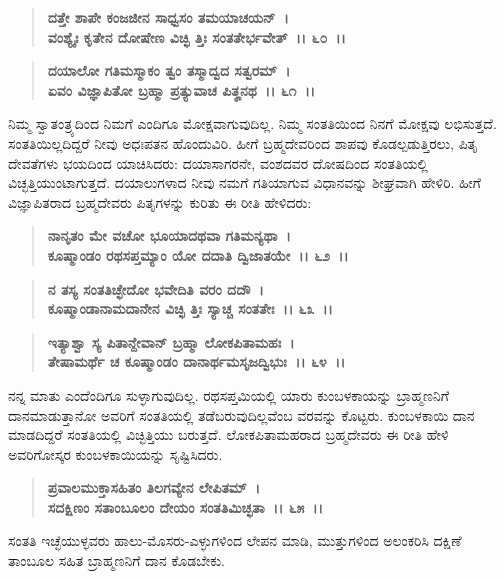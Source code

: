\begin{verse}
\textbf{ದತ್ತೇ ಶಾಪೇ ಕಂಜಜೀನ ಸಾಧ್ವಸಂ ತಮಯಾಚಯನ್~।}\\\textbf{ವಂಶ್ಯೈಃ ಕೃತೇನ ದೋಷೇಣ ವಿಚ್ಛಿ ತ್ತಿಃ ಸಂತತೇರ್ಭವೇತ್~।। ೬೦~।। }
\end{verse}

\begin{verse}
\textbf{ದಯಾಲೋ ಗತಿಮಸ್ಮಾಕಂ ತ್ವಂ ತಸ್ಮಾದ್ವದ ಸತ್ವರಮ್~।}\\\textbf{ಏವಂ ವಿಜ್ಞಾಪಿತೋ ಬ್ರಹ್ಮಾ ಪ್ರತ್ಯುವಾಚ ಪಿತೄನಥ~।। ೬೧~।।}
\end{verse}

ನಿಮ್ಮ ಸ್ವಾತಂತ್ರ್ಯದಿಂದ ನಿಮಗೆ ಎಂದಿಗೂ ಮೋಕ್ಷವಾಗುವುದಿಲ್ಲ. ನಿಮ್ಮ ಸಂತತಿಯಿಂದ ನಿನಗೆ ಮೋಕ್ಷವು ಲಭಿಸುತ್ತದೆ. ಸಂತತಿಯಿಲ್ಲದಿದ್ದರೆ ನೀವು ಅಧಃಪತನ ಹೊಂದುವಿರಿ. ಹೀಗೆ ಬ್ರಹ್ಮದೇವರಿಂದ ಶಾಪವು ಕೊಡಲ್ಪಡುತ್ತಿರಲು, ಪಿತೃ ದೇವತೆಗಳು ಭಯದಿಂದ ಯಾಚಿಸಿದರು: ದಯಾಸಾಗರನೇ, ವಂಶದವರ ದೋಷದಿಂದ ಸಂತತಿಯಲ್ಲಿ ವಿಚ್ಛತ್ತಿಯುಂಟಾಗುತ್ತದೆ. ದಯಾಲು\-ಗಳಾದ ನೀವು ನಮಗೆ ಗತಿಯಾಗುವ ವಿಧಾನವನ್ನು ಶೀಘ್ರವಾಗಿ ಹೇಳಿರಿ. ಹೀಗೆ ವಿಜ್ಞಾಪಿತರಾದ ಬ್ರಹ್ಮದೇವರು ಪಿತೃಗಳನ್ನು ಕುರಿತು ಈ ರೀತಿ ಹೇಳಿದರು:

\begin{verse}
\textbf{ನಾನೃತಂ ಮೇ ವಚೋ ಭೂಯಾದಥವಾ ಗತಿಮನ್ಯಥಾ~।}\\\textbf{ಕೂಷ್ಮಾಂಡಂ ರಥಸಪ್ತಮ್ಯಾಂ ಯೋ ದದಾತಿ ದ್ವಿಜಾತಯೇ~।। ೬೨~।। }
\end{verse}

\begin{verse}
\textbf{ನ ತಸ್ಯ ಸಂತತಿಚ್ಛೇದೋ ಭವೇದಿತಿ ವರಂ ದದೌ~।}\\\textbf{ಕೂಷ್ಮಾಂಡಾನಾಮದಾನೇನ ವಿಚ್ಛಿ ತ್ತಿಃ ಸ್ಯಾಚ್ಚ ಸಂತತೇಃ~।। ೬೩~।। }
\end{verse}

\begin{verse}
\textbf{ಇತ್ಯಾಶ್ವಾ ಸ್ಯ ಪಿತಾನ್ದೇವಾನ್ ಬ್ರಹ್ಮಾ ಲೋಕಪಿತಾಮಹಃ~।}\\\textbf{ತೇಷಾಮರ್ಥೆ ಚ ಕೂಷ್ಮಾಂಡಂ ದಾನಾರ್ಥಮಸೃಜದ್ವಿಭುಃ~।। ೬೪~।।}
\end{verse}

ನನ್ನ ಮಾತು ಎಂದೆಂದಿಗೂ ಸುಳ್ಳಾಗುವುದಿಲ್ಲ. ರಥಸಪ್ತಮಿಯಲ್ಲಿ ಯಾರು ಕುಂಬಳ\-ಕಾಯನ್ನು ಬ್ರಾಹ್ಮಣನಿಗೆ ದಾನಮಾಡುತ್ತಾನೋ ಅವರಿಗೆ ಸಂತತಿಯಲ್ಲಿ ತಡೆಬರುವುದಿಲ್ಲವೆಂಬ ವರವನ್ನು ಕೊಟ್ಟರು. ಕುಂಬಳಕಾಯಿ ದಾನ ಮಾಡದಿದ್ದರೆ ಸಂತತಿಯಲ್ಲಿ ವಿಚ್ಛಿತ್ತಿಯು ಬರುತ್ತದೆ. ಲೋಕಪಿತಾಮಹರಾದ ಬ್ರಹ್ಮದೇವರು ಈ ರೀತಿ ಹೇಳಿ ಅವರಿಗೋಸ್ಕರ ಕುಂಬಳಕಾಯಿಯನ್ನು ಸೃಷ್ಟಿಸಿದರು.

\begin{verse}
\textbf{ಪ್ರವಾಲಮುಕ್ತಾಸಹಿತಂ ತಿಲಗವ್ಯೇನ ಲೇಪಿತಮ್~।}\\\textbf{ಸದಕ್ಷಿಣಂ ಸತಾಂಬೂಲಂ ದೇಯಂ ಸಂತತಿಮಿಚ್ಛತಾ~।। ೬೫~।।}
\end{verse}

ಸಂತತಿ ಇಚ್ಛೆಯುಳ್ಳವರು ಹಾಲು-ಮೊಸರು-ಎಳ್ಳುಗಳಿಂದ ಲೇಪನ ಮಾಡಿ, ಮುತ್ತುಗಳಿಂದ ಅಲಂಕರಿಸಿ ದಕ್ಷಿಣೆ ತಾಂಬೂಲ ಸಹಿತ ಬ್ರಾಹ್ಮಣನಿಗೆ ದಾನ ಕೊಡಬೇಕು.


